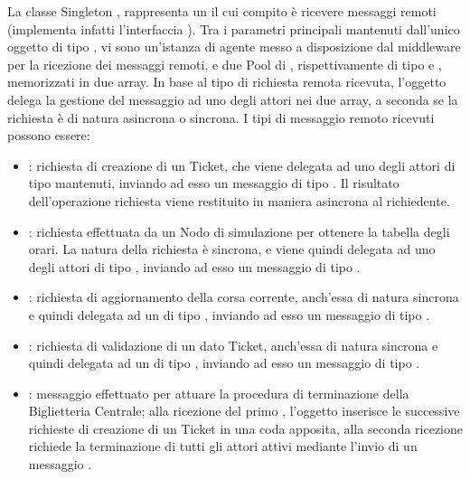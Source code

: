 	La classe Singleton , rappresenta un  il cui compito è ricevere messaggi remoti (implementa infatti l'interfaccia ). Tra i parametri principali mantenuti dall'unico oggetto di tipo , vi sono un'istanza di agente messo a disposizione dal middleware  per la ricezione dei messaggi remoti, e due Pool di , rispettivamente di tipo  e , memorizzati in due array.
	In base al tipo di richiesta remota ricevuta, l'oggetto  delega la gestione del messaggio ad uno degli attori nei due array, a seconda se la richiesta è di natura asincrona o sincrona. I tipi di messaggio remoto ricevuti possono essere:
	\begin{itemize}
		\item {}: richiesta di creazione di un Ticket, che viene delegata ad uno degli attori di tipo  mantenuti, inviando ad esso un messaggio di tipo . Il risultato dell'operazione richiesta viene restituito in maniera asincrona al richiedente.
		\item {}: richiesta effettuata da un Nodo di simulazione per ottenere la tabella degli orari. La natura della richiesta è sincrona, e viene quindi delegata ad uno degli attori di tipo , inviando ad esso un messaggio di tipo .
		
		\item {}: richiesta di aggiornamento della corsa corrente, anch'essa di natura sincrona e quindi delegata ad un  di tipo , inviando ad esso un messaggio di tipo .
		
		\item {}: richiesta di validazione di un dato Ticket, anch'essa di natura sincrona e quindi delegata ad un   di tipo , inviando ad esso un messaggio di tipo .
		
		\item {}: messaggio effettuato per attuare la procedura di terminazione della Biglietteria Centrale; alla ricezione del primo , l'oggetto  inserisce le successive richieste di creazione di un Ticket in una coda apposita, alla seconda ricezione richiede la terminazione di tutti gli attori attivi mediante l'invio di un messaggio .		
		
	\end{itemize}
	
